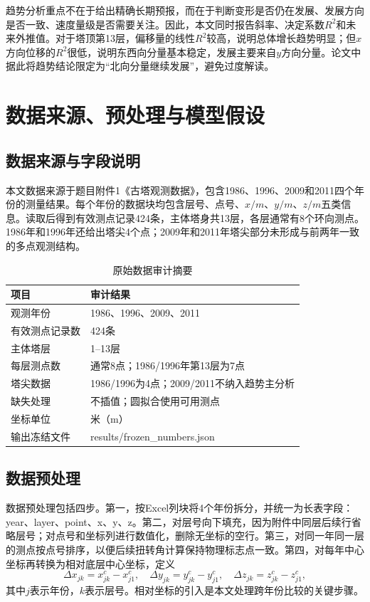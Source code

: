 \documentclass[UTF8,a4paper,12pt]{ctexart}
\begin{document}
趋势分析重点不在于给出精确长期预报，而在于判断变形是否仍在发展、发展方向是否一致、速度量级是否需要关注。因此，本文同时报告斜率、决定系数$R^2$和未来外推值。对于塔顶第13层，偏移量的线性$R^2$较高，说明总体增长趋势明显；但$x$方向位移的$R^2$很低，说明东西向分量基本稳定，发展主要来自$y$方向分量。论文中据此将趋势结论限定为“北向分量继续发展”，避免过度解读。

\section{数据来源、预处理与模型假设}
\subsection{数据来源与字段说明}
本文数据来源于题目附件1《古塔观测数据》，包含1986、1996、2009和2011四个年份的测量结果。每个年份的数据块均包含层号、点号、$x/m$、$y/m$、$z/m$五类信息。读取后得到有效测点记录424条，主体塔身共13层，各层通常有8个环向测点。1986年和1996年还给出塔尖4个点；2009年和2011年塔尖部分未形成与前两年一致的多点观测结构。

\begin{table}[H]
\centering
\caption{原始数据审计摘要}
\begin{tabular}{ll}
\toprule
项目 & 审计结果\\
\midrule
观测年份 & 1986、1996、2009、2011\\
有效测点记录数 & 424条\\
主体塔层 & 1--13层\\
每层测点数 & 通常8点；1986/1996年第13层为7点\\
塔尖数据 & 1986/1996为4点；2009/2011不纳入趋势主分析\\
缺失处理 & 不插值；圆拟合使用可用测点\\
坐标单位 & 米（m）\\
输出冻结文件 & results/frozen\_numbers.json\\
\bottomrule
\end{tabular}
\end{table}

\subsection{数据预处理}
数据预处理包括四步。第一，按Excel列块将4个年份拆分，并统一为长表字段：year、layer、point、x、y、z。第二，对层号向下填充，因为附件中同层后续行省略层号；对点号和坐标列进行数值化，删除无坐标的空行。第三，对同一年同一层的测点按点号排序，以便后续扭转角计算保持物理标志点一致。第四，对每年中心坐标再转换为相对底层中心坐标，定义
\begin{equation}
\Delta x_{jk}=x_{jk}^{c}-x_{j1}^{c},\quad
\Delta y_{jk}=y_{jk}^{c}-y_{j1}^{c},\quad
\Delta z_{jk}=z_{jk}^{c}-z_{j1}^{c},
\end{equation}
其中$j$表示年份，$k$表示层号。相对坐标的引入是本文处理跨年份比较的关键步骤。
\end{document}
